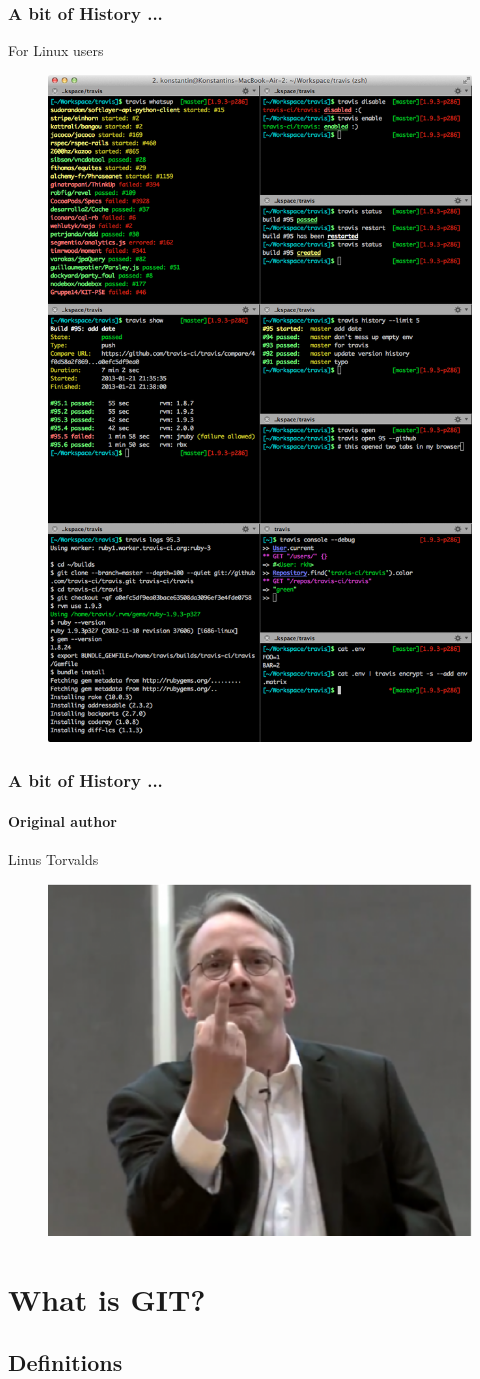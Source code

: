 \documentclass{beamer}
\begin{document}
\begin{frame}
  \frametitle{A bit of History ...}
  \begin{block}{For Linux users}
    \begin{figure}
      \centering
      \includegraphics[width=.35\textwidth]{./images/git-mess.png}
    \end{figure}
  \end{block}
\end{frame}

\begin{frame}
  \frametitle{A bit of History ...}
  \framesubtitle{Original author}
  \pause
  \begin{block}{Linus Torvalds}
    \begin{figure}
      \centering
      \includegraphics[width=.5\textwidth]{./images/linus.eps}
    \end{figure}
  \end{block}
\end{frame}

\section{What is GIT?}

\subsection{Definitions}
\end{document}
